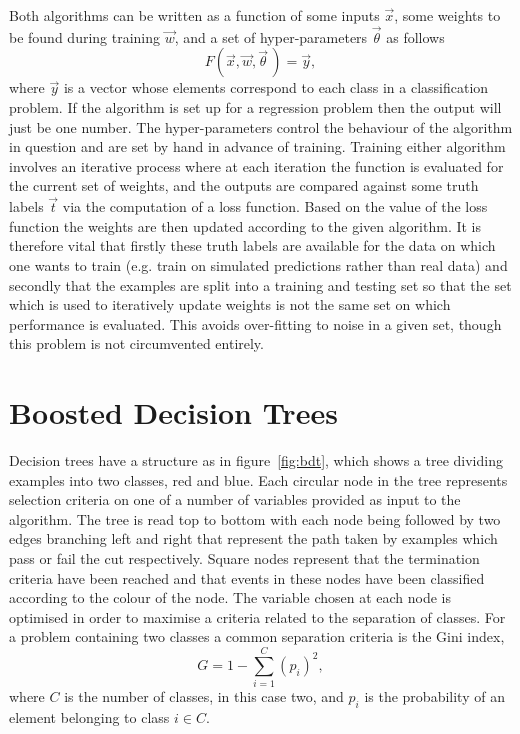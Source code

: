 Both algorithms can be written as a function of some inputs $\vec{x}$, some
weights to be found during training $\vec{w}$, and a set of hyper-parameters
$\vec{\theta}$ as follows
\begin{equation}
  F(\vec{x}, \vec{w}, \vec{\theta} \,) = \vec{y},
  \label{eq:ml-general}
\end{equation}
where $\vec{y}$ is a vector whose elements correspond to each class in a
classification problem. If the algorithm is set up for a regression problem then
the output will just be one number. The hyper-parameters control the behaviour
of the algorithm in question and are set by hand in advance of training.
Training either algorithm involves an iterative process where at each iteration
the function is evaluated for the current set of weights, and the outputs are
compared against some truth labels $\vec{t}$ via the computation of a loss
function. Based on the value of the loss function the weights are then updated
according to the given algorithm. It is therefore vital that firstly these truth
labels are available for the data on which one wants to train (e.g. train on
simulated predictions rather than real data) and secondly that the examples are
split into a training and testing set so that the set which is used to
iteratively update weights is not the same set on which performance is
evaluated. This avoids over-fitting to noise in a given set, though this
problem is not circumvented entirely.

\section{Boosted Decision Trees}%
\label{sec:bdts}
Decision trees have a structure as in figure~\ref{fig:bdt}, which shows a tree
dividing examples into two classes, red and blue.
 Each circular node in the tree represents
selection criteria on one of a number of variables provided as input to the
algorithm. The tree is read top to bottom with each node being followed by two
edges branching left and right that represent the path taken by examples which
pass or fail the cut respectively. Square nodes represent that the termination
criteria have been reached and that events in these nodes have been classified
according to the colour of the node. The variable chosen at each node is
optimised in order to maximise a criteria related to the separation of classes.
For a problem containing two classes a common separation criteria is the Gini
index,
\begin{equation} G = 1 - \sum_{i=1}^{C}(p_i)^2,
  \label{eq:gini}
\end{equation} where $C$ is the number of classes, in this case two, and $p_i$
is the probability of an element belonging to class $i \in C$.

